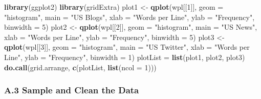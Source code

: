 \documentclass[]{article}
\newenvironment{Shaded}{\begin{snugshade}}{\end{snugshade}}
\newcommand{\DataTypeTok}[1]{\textcolor[rgb]{0.13,0.29,0.53}{#1}}
\newcommand{\DecValTok}[1]{\textcolor[rgb]{0.00,0.00,0.81}{#1}}
\newcommand{\KeywordTok}[1]{\textcolor[rgb]{0.13,0.29,0.53}{\textbf{#1}}}
\newcommand{\NormalTok}[1]{#1}
\newcommand{\StringTok}[1]{\textcolor[rgb]{0.31,0.60,0.02}{#1}}
\begin{document}
\begin{Shaded}
\begin{Highlighting}[]
\KeywordTok{library}\NormalTok{(ggplot2)}
\KeywordTok{library}\NormalTok{(gridExtra)}
\NormalTok{plot1 <-}\StringTok{ }\KeywordTok{qplot}\NormalTok{(wpl[[}\DecValTok{1}\NormalTok{]],}
               \DataTypeTok{geom =} \StringTok{"histogram"}\NormalTok{,}
               \DataTypeTok{main =} \StringTok{"US Blogs"}\NormalTok{,}
               \DataTypeTok{xlab =} \StringTok{"Words per Line"}\NormalTok{,}
               \DataTypeTok{ylab =} \StringTok{"Frequency"}\NormalTok{,}
               \DataTypeTok{binwidth =} \DecValTok{5}\NormalTok{)}
\NormalTok{plot2 <-}\StringTok{ }\KeywordTok{qplot}\NormalTok{(wpl[[}\DecValTok{2}\NormalTok{]],}
               \DataTypeTok{geom =} \StringTok{"histogram"}\NormalTok{,}
               \DataTypeTok{main =} \StringTok{"US News"}\NormalTok{,}
               \DataTypeTok{xlab =} \StringTok{"Words per Line"}\NormalTok{,}
               \DataTypeTok{ylab =} \StringTok{"Frequency"}\NormalTok{,}
               \DataTypeTok{binwidth =} \DecValTok{5}\NormalTok{)}
\NormalTok{plot3 <-}\StringTok{ }\KeywordTok{qplot}\NormalTok{(wpl[[}\DecValTok{3}\NormalTok{]],}
               \DataTypeTok{geom =} \StringTok{"histogram"}\NormalTok{,}
               \DataTypeTok{main =} \StringTok{"US Twitter"}\NormalTok{,}
               \DataTypeTok{xlab =} \StringTok{"Words per Line"}\NormalTok{,}
               \DataTypeTok{ylab =} \StringTok{"Frequency"}\NormalTok{,}
               \DataTypeTok{binwidth =} \DecValTok{1}\NormalTok{)}
\NormalTok{plotList =}\StringTok{ }\KeywordTok{list}\NormalTok{(plot1, plot2, plot3)}
\KeywordTok{do.call}\NormalTok{(grid.arrange, }\KeywordTok{c}\NormalTok{(plotList, }\KeywordTok{list}\NormalTok{(}\DataTypeTok{ncol =} \DecValTok{1}\NormalTok{)))}
\end{Highlighting}
\end{Shaded}

\hypertarget{a.3-sample-and-clean-the-data}{%
\subsubsection{A.3 Sample and Clean the
Data}\label{a.3-sample-and-clean-the-data}}
\end{document}
